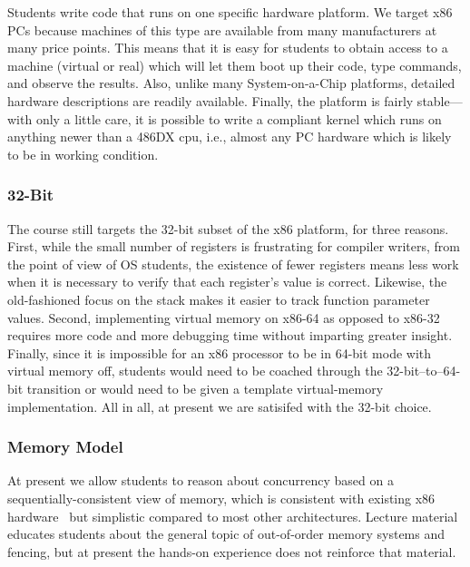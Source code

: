 Students write code that runs on one specific
hardware platform.
We target x86 PCs because machines of this type are
available from many manufacturers at many price points.
This means that it is easy for students to obtain access
to a machine (virtual or real) which will let them boot
up their code, type commands, and observe the results.
Also, unlike many System-on-a-Chip platforms,
detailed hardware descriptions are readily available.
Finally, the platform is fairly stable---with only a
little care, it is possible to write a compliant
kernel which runs on anything newer than a 486DX cpu,
i.e., almost any PC hardware which is likely to be in
working condition.

\subsubsection{32-Bit}

The course still targets the 32-bit
subset of the x86 platform, for three reasons.
First, while the small number of registers is
frustrating for compiler writers,
from the point of view of OS students,
the existence of fewer registers means less work
when it is necessary to verify that each register's
value is correct.
Likewise, the old-fashioned focus on the stack
makes it easier to track function parameter values.
Second, implementing virtual memory on x86-64 as
opposed to x86-32 requires more code and more
debugging time without imparting greater insight.
Finally, since it is impossible for an x86 processor
to be in 64-bit mode with virtual memory off,
students would need to be coached through the
32-bit--to--64-bit transition or would need
to be given a template virtual-memory implementation.
All in all, at present we are satisifed with
the 32-bit choice.

\subsubsection{Memory Model}

At present we allow students
to reason about concurrency based on a
sequentially-consistent view of
memory, which is consistent with
existing x86 hardware~\cite{SewellSOZNM:x86tso-cacm10}
but simplistic compared to most other
architectures.
Lecture material educates students about the
general topic of out-of-order memory systems
and fencing,
but at present the hands-on experience does not
reinforce that material.

